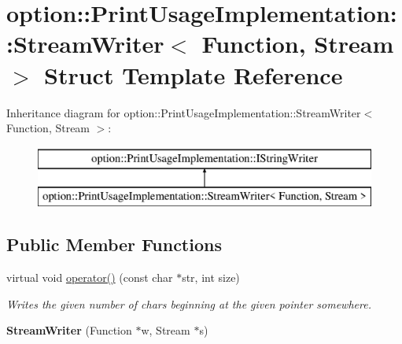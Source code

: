 \hypertarget{structoption_1_1PrintUsageImplementation_1_1StreamWriter}{}\section{option\+:\+:Print\+Usage\+Implementation\+:\+:Stream\+Writer$<$ Function, Stream $>$ Struct Template Reference}
\label{structoption_1_1PrintUsageImplementation_1_1StreamWriter}
Inheritance diagram for option\+:\+:Print\+Usage\+Implementation\+:\+:Stream\+Writer$<$ Function, Stream $>$\+:\begin{figure}[H]
\begin{center}
\leavevmode
\includegraphics[height=2.000000cm]{structoption_1_1PrintUsageImplementation_1_1StreamWriter}
\end{center}
\end{figure}
\subsection*{Public Member Functions}
\begin{DoxyCompactItemize}
\item 
\mbox{\label{structoption_1_1PrintUsageImplementation_1_1StreamWriter_ae39bc6378c22d24a490104b7764c37b7}} 
virtual void \hyperlink{structoption_1_1PrintUsageImplementation_1_1StreamWriter_ae39bc6378c22d24a490104b7764c37b7}{operator()} (const char $\ast$str, int size)
\begin{DoxyCompactList}\small\item\em Writes the given number of chars beginning at the given pointer somewhere. \end{DoxyCompactList}\item 
\mbox{\label{structoption_1_1PrintUsageImplementation_1_1StreamWriter_aa6ab48848dcbeb9e2cbde5d05ec35005}} 
{\bfseries Stream\+Writer} (Function $\ast$w, Stream $\ast$s)
\end{DoxyCompactItemize}
